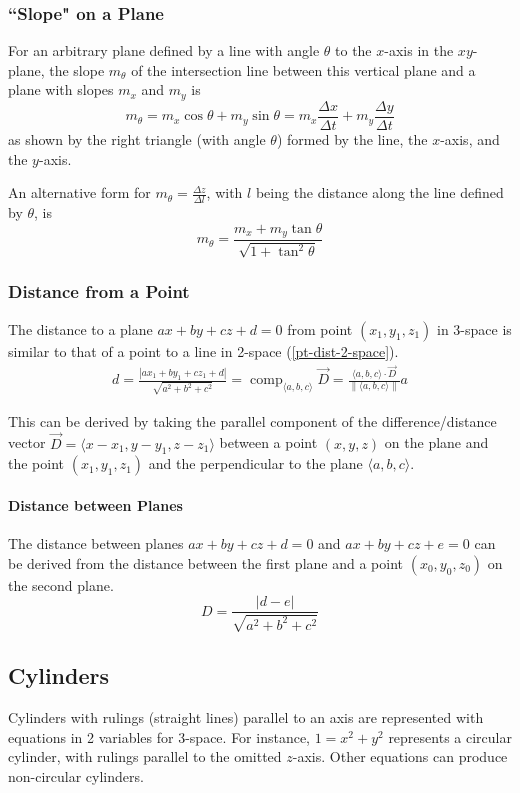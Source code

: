 \documentclass{article}
\DeclareMathOperator{\comp}{comp}
\newcommand{\vect}[1]{\ensuremath{\overrightarrow{#1}}}
\newcommand{\magnitude}[1]{\ensuremath{\lVert #1 \rVert}}
\newcommand{\abs}[1]{\left|#1\right|}
\begin{document}
\subsubsection{``Slope" on a Plane}
For an arbitrary plane defined by a line with angle $\theta$ to the $x$-axis in the $xy$-plane, the slope $m_\theta$ of the intersection line between this vertical plane and a plane with slopes $m_x$ and $m_y$ is
$$m_\theta = m_x\cos{\theta} + m_y\sin{\theta}= m_x\frac{\Delta x}{\Delta t} + m_y\frac{\Delta y}{\Delta t}$$ as shown by the right triangle (with angle $\theta$) formed by the line, the $x$-axis, and the $y$-axis.

An alternative form for $m_\theta=\frac{\Delta z}{\Delta l}$, with $l$ being the distance along the line defined by $\theta$, is $$m_\theta = \frac{m_x+m_y\tan{\theta}}{\sqrt{1+\tan^2{\theta}}}$$

\subsubsection{Distance from a Point}
The distance to a plane $ax+by+cz+d=0$ from point $(x_1, y_1, z_1)$ in 3-space is similar to that of a point to a line in 2-space (\ref{pt-dist-2-space}).
\begin{align*}
d=\frac{\abs{ax_1+by_1+cz_1+d}}{\sqrt{a^2+b^2+c^2}} =
\comp_{\langle a, b, c \rangle} \vect{D} = \frac{\langle a, b, c \rangle \cdot \vect{D}}{\magnitude{\langle a, b, c \rangle}}a
\end{align*}

This can be derived by taking the parallel component of the difference/distance vector $\vect{D} = \langle x-x_1, y-y_1, z-z_1\rangle$ between a point $(x,y,z)$ on the plane and the point $(x_1, y_1, z_1)$ and the perpendicular to the plane $\langle a, b, c \rangle$.

\paragraph{Distance between Planes}
The distance between planes $ax + by + cz + d = 0$ and $ax + by + cz + e = 0$ can be derived from the distance between the first plane and a point $(x_0, y_0, z_0)$ on the second plane.
\[
D=\frac{\abs{d-e}}{\sqrt{a^2+b^2+c^2}}
\]

\subsection{Cylinders}
Cylinders with rulings (straight lines) parallel to an axis are represented with equations in 2 variables for 3-space.
For instance, $1 = x^2 + y^2$ represents a circular cylinder, with rulings parallel to the omitted $z$-axis.
Other equations can produce non-circular cylinders.
\end{document}

